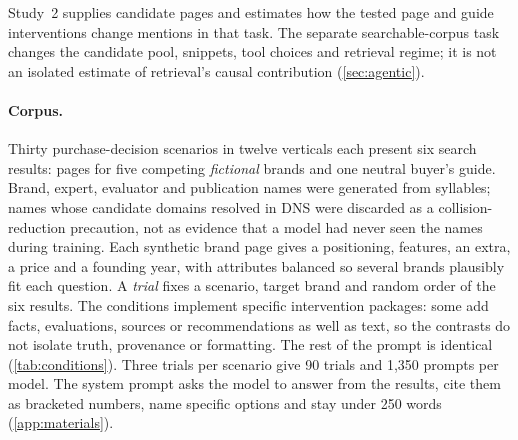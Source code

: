 \documentclass[11pt]{article}
\begin{document}
Study~2 supplies candidate pages and estimates how the tested page and guide interventions change mentions in that task.
The separate searchable-corpus task changes the candidate pool, snippets, tool choices and retrieval regime; it is not
an isolated estimate of retrieval's causal contribution (\cref{sec:agentic}).

\paragraph{Corpus.} Thirty purchase-decision scenarios in twelve verticals each present six search results: pages for
five competing \emph{fictional} brands and one neutral buyer's guide. Brand, expert, evaluator and publication names
were generated from syllables; names whose candidate domains resolved in DNS were discarded as a collision-reduction
precaution, not as evidence that a model had never seen the names during training. Each synthetic brand page gives a
positioning, features, an extra, a price and a founding year, with attributes balanced so several brands plausibly fit
each question. A \emph{trial} fixes a scenario, target brand and random order of the six results. The conditions implement
specific intervention packages: some add facts, evaluations, sources or recommendations as well as text, so the
contrasts do not isolate truth, provenance or formatting. The rest of the prompt is identical (\cref{tab:conditions}).
Three trials per scenario give 90 trials and 1{,}350 prompts per model. The system prompt asks the model to answer from
the results, cite them as bracketed numbers, name specific options and stay under 250 words (\cref{app:materials}).
\end{document}

